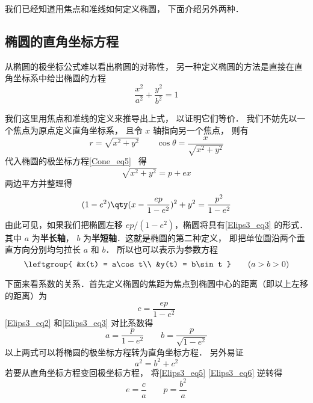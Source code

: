 

我们已经知道用焦点和准线如何定义椭圆， 下面介绍另外两种．

\subsection{椭圆的直角坐标方程}
从椭圆的极坐标公式难以看出椭圆的对称性， 另一种定义椭圆的方法是直接在直角坐标系中给出椭圆的方程
\begin{equation}\label{Elips3_eq3}
\frac{x^2}{a^2} + \frac{y^2}{b^2} = 1
\end{equation}

我们这里用焦点和准线的定义来推导出上式， 以证明它们等价． 我们不妨先以一个焦点为原点定义直角坐标系， 且令 $x$ 轴指向另一个焦点， 则有
\begin{equation}
r = \sqrt{x^2 + y^2} \qquad \cos\theta = \frac{x}{\sqrt{x^2 + y^2}}
\end{equation}
代入椭圆的极坐标方程\autoref{Cone_eq5}~ 得
\begin{equation}
\sqrt{x^2 + y^2} = p + ex
\end{equation}
两边平方并整理得
\begin{equation}\label{Elips3_eq2}
(1 - e^2) \qty( x - \frac{ep}{1 - e^2} )^2 + y^2 = \frac{p^2}{1 - e^2}
\end{equation}
由此可见，如果我们把椭圆左移 $ep/(1 - e^2)$，椭圆将具有\autoref{Elips3_eq3} 的形式． 其中 $a$ 为\textbf{半长轴}， $b$ 为\textbf{半短轴}．这就是椭圆的第二种定义， 即把单位圆沿两个垂直方向分别均匀拉长 $a$ 和 $b$． 所以也可以表示为参数方程
\begin{equation}\label{Elips3_eq1}
\leftgroup{
&x(t) = a\cos t\\
&y(t) = b\sin t
} \qquad
(a > b > 0)
\end{equation}

下面来看系数的关系．首先定义椭圆的焦距为焦点到椭圆中心的距离（即以上左移的距离）为
\begin{equation}\label{Elips3_eq5}
c = \frac{ep}{1 - e^2}
\end{equation}
\autoref{Elips3_eq2} 和\autoref{Elips3_eq3} 对比系数得
\begin{equation}\label{Elips3_eq6}
a = \frac{p}{1 - e^2} \qquad b = \frac{p}{\sqrt {1 - e^2} }
\end{equation}
以上两式可以将椭圆的极坐标方程转为直角坐标方程． 另外易证
\begin{equation}\label{Elips3_eq7}
a^2 = b^2 + c^2
\end{equation}
若要从直角坐标方程变回极坐标方程， 将\autoref{Elips3_eq5} \autoref{Elips3_eq6} 逆转得
\begin{equation}\label{Elips3_eq8}
e = \frac{c}{a}\qquad
p = \frac{b^2}{a}
\end{equation}


